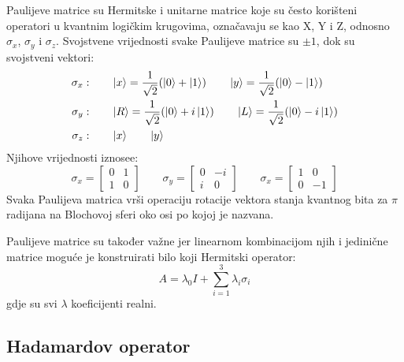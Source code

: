 Paulijeve matrice su Hermitske i unitarne matrice koje su često korišteni operatori u kvantnim logičkim krugovima, označavaju se kao X, Y i Z, odnosno $\sigma_x$, $\sigma_y$ i $\sigma_z$. Svojstvene vrijednosti svake Paulijeve matrice su $\pm 1$, dok su svojstveni vektori:
\begin{align*}
\sigma_x:&
\qquad
\ket{x} = \frac{1}{\sqrt{2}}(\ket{0} + \ket{1})
\qquad
\ket{y} = \frac{1}{\sqrt{2}}(\ket{0} - \ket{1})
\\
\sigma_y:&
\qquad
\ket{R} = \frac{1}{\sqrt{2}}(\ket{0} + i\ket{1})
\qquad
\ket{L} = \frac{1}{\sqrt{2}}(\ket{0} - i\ket{1})
\\
\sigma_z:&
\qquad
\ket{x}
\qquad
\ket{y}
\end{align*}
Njihove vrijednosti iznosee:
\[
\sigma_x = \begin{bmatrix}
0 & 1 \\ 1 & 0
\end{bmatrix}
\qquad
\sigma_y = \begin{bmatrix}
0 & -i \\ i & 0
\end{bmatrix}
\qquad
\sigma_x = \begin{bmatrix}
1 & 0 \\ 0 & -1
\end{bmatrix}
\]
Svaka Paulijeva matrica vrši operaciju rotacije vektora stanja kvantnog bita za $\pi$ radijana na Blochovoj sferi oko osi po kojoj je nazvana.

Paulijeve matrice su također važne jer linearnom kombinacijom njih i jedinične matrice moguće je konstruirati bilo koji Hermitski operator:
\begin{equation}
A = \lambda_0I + \sum_{i = 1}^3\lambda_i\sigma_i
\label{eq:hermop}
\end{equation}
gdje su svi $\lambda$ koeficijenti realni.


\subsection{Hadamardov operator}

